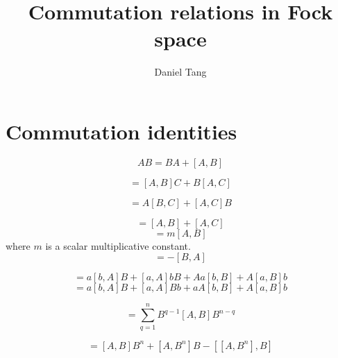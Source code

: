 \documentclass[letterpaper,10pt]{article}
\begin{document}
\title{\Large \bf Commutation relations in Fock space}

\author{
{\rm Daniel Tang}\\
}

\maketitle


\section{Commutation identities}

\begin{equation}
AB = BA + [A,B]
\end{equation}

\begin{equation}
[A, BC] = [A,B]C + B[A,C]
\end{equation}

\begin{equation}
[AB, C] =  A[B,C] + [A,C]B
\end{equation}

\begin{equation}
[A,B + C] = [A,B] + [A,C]
\label{sumcommute}
\end{equation}
\begin{equation}
[A,mB] = m[A,B]
\end{equation}
where $m$ is a scalar multiplicative constant.
\begin{equation}
[A,B] = -[B,A]
\end{equation}

\begin{equation}
[ab,AB] = a[b,A]B + [a,A]bB + Aa[b,B] + A[a,B]b
\end{equation}
\begin{equation}
 = a[b,A]B  + [a,A]Bb + aA[b,B] + A[a,B]b
\end{equation}

\begin{equation}
[A,B^n] = \sum_{q=1}^n B^{q-1}[A,B]B^{n-q}
\end{equation}

\begin{equation}
[A,B^{n+1}] = [A,B]B^n + [A,B^n]B - [[A,B^n],B]
\end{equation}
\end{document}
